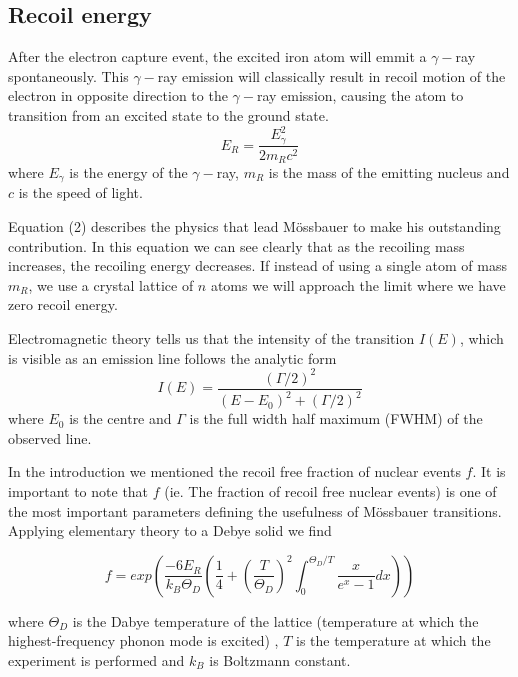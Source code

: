 \documentclass[a4paper, twocolumn]{article}
\begin{document}
\subsection{Recoil energy}
After the electron capture event, the excited iron atom will emmit a $\gamma-$ray spontaneously. This $\gamma-$ray emission will classically result in recoil motion of the electron in opposite direction to the $\gamma-$ray emission, causing the atom to transition from an excited state to the ground state\cite{2}.
\begin{equation} E_R = \frac{E_{\gamma}^2}{2 m_R c^2}
\end{equation}
where $E_{\gamma}$ is the energy of the $\gamma-$ray, $m_R$ is the mass of the emitting nucleus and $c$ is the speed of light.

Equation (2) describes the physics that lead Mössbauer to make his outstanding contribution. In this equation we can see clearly that as the recoiling mass increases, the recoiling energy decreases. If instead of using a single atom of mass $m_R$, we use a crystal lattice of $n$ atoms we will approach the limit where we have zero recoil energy\cite{2}.

Electromagnetic theory tells us that the intensity of the transition $I(E)$, which is visible as an emission line follows the analytic form
\begin{equation} I(E) = \frac{(\Gamma / 2)^2}{(E - E_0)^2 + (\Gamma /2)^2}
\end{equation}
where $E_0$ is the centre and $\Gamma$ is the full width half maximum (FWHM) of the observed line.

In the introduction we mentioned the recoil free fraction of nuclear events $f$.
It is important to note that $f$ (ie. The fraction of recoil free nuclear events) is one of the most important parameters defining the usefulness of Mössbauer transitions\cite{8}.
Applying elementary theory to a Debye solid we find

\begin{equation} 
f = exp \left (\frac{-6 E_R}{k_B \Theta_D} \left (\frac{1}{4} + \left (\frac{T}{\Theta_D} \right)^2  \int_{0}^{\Theta_{D}/T} \frac{x}{e^x -1}dx \right )\right )
\end{equation}


where $\Theta_D$ is the Dabye temperature of the lattice (temperature at which the highest-frequency phonon mode is excited) \cite{13}, $T$ is the temperature at which the experiment is performed\cite{0} and $k_B$ is Boltzmann constant.
\end{document}
